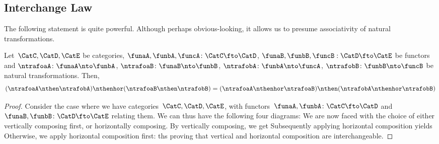 
\subsection{Interchange Law}

The following statement is quite powerful.
Although perhaps obvious-looking, it allows us to presume associativity of
natural transformations.

\begin{proposition}[Interchange] \label{prop:interchange}
    Let~$\CatC, \CatD, \CatE$ be categories, $\funaA, \funbA, \funcA\colon\CatC \fto \CatD$, $\funaB, \funbB, \funcB:\CatD \fto \CatE$ be functors and $\ntrafoaA\colon\funaA\nto\funbA$, $\ntrafoaB\colon\funaB\nto\funbB$, $\ntrafobA\colon\funbA\nto\funcA$, $\ntrafobB\colon\funbB\nto\funcB$ be natural transformations.
    Then,
    \begin{equation}
        (\ntrafoaA \nthen \ntrafobA) \nthenhor (\ntrafoaB \nthen \ntrafobB) =
        (\ntrafoaA \nthenhor \ntrafoaB) \nthen (\ntrafobA \nthenhor \ntrafobB)
    \end{equation}
\end{proposition}

\begin{proof}
    Consider the case where we have categories~$\CatC, \CatD, \CatE$, with functors~$\funaA, \funbA\colon\CatC \fto \CatD$ and~$\funaB, \funbB\colon\CatD \fto \CatE$ relating them.
    We can thus have the following four diagrams:
    We are now faced with the choice of either vertically composing first, or horizontally composing.
    By vertically composing, we get
    Subsequently applying horizontal composition yields
    Otherwise, we apply horizontal composition first:
    ths proving that vertical and horizontal composition are interchangeable.
\end{proof}


